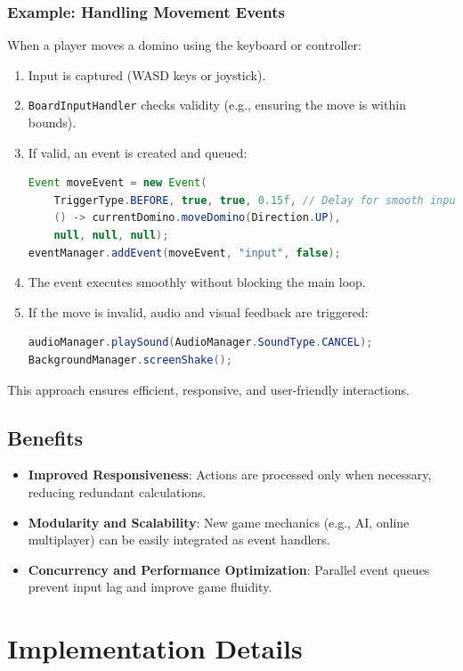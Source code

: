 \documentclass[conference]{IEEEtran}
\begin{document}
\subsubsection{Example: Handling Movement Events}
When a player moves a domino using the keyboard or controller:
\begin{enumerate}
    \item Input is captured (WASD keys or joystick).
    \item \texttt{BoardInputHandler} checks validity (e.g., ensuring the move is within bounds).
    \item If valid, an event is created and queued:
    \begin{lstlisting}[language=Java]
Event moveEvent = new Event(
    TriggerType.BEFORE, true, true, 0.15f, // Delay for smooth input
    () -> currentDomino.moveDomino(Direction.UP),
    null, null, null);
eventManager.addEvent(moveEvent, "input", false);
    \end{lstlisting}
    \item The event executes smoothly without blocking the main loop.
    \item If the move is invalid, audio and visual feedback are triggered:
    \begin{lstlisting}[language=Java]
audioManager.playSound(AudioManager.SoundType.CANCEL);
BackgroundManager.screenShake();
    \end{lstlisting}
\end{enumerate}
This approach ensures efficient, responsive, and user-friendly interactions.

\subsection{Benefits}
\begin{itemize}
    \item \textbf{Improved Responsiveness}: Actions are processed only when necessary, reducing redundant calculations.
    \item \textbf{Modularity and Scalability}: New game mechanics (e.g., AI, online multiplayer) can be easily integrated as event handlers.
    \item \textbf{Concurrency and Performance Optimization}: Parallel event queues prevent input lag and improve game fluidity.
\end{itemize}

\section{Implementation Details}
\end{document}
